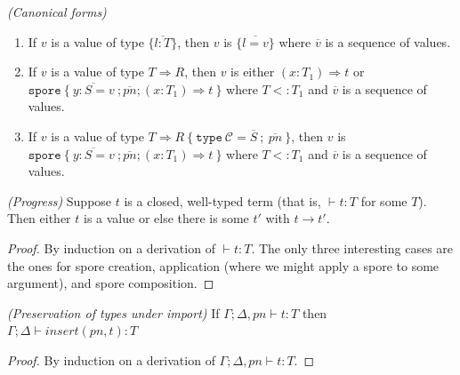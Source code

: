 \documentclass{llncs}
\newcommand{\seq}[1]{\overline{#1}}
\begin{document}
\begin{lemma}
\emph{(Canonical forms)}
\label{lem:canonical}
\begin{enumerate}

\item If $v$ is a value of type $\{ \seq{l : T} \}$, then $v$ is $\{ \seq{l = v} \}$ where $\seq{v}$ is a sequence of values.

\item If $v$ is a value of type $T \Rightarrow R$, then $v$ is either $(x: T_1) \Rightarrow t$ or \\ $\texttt{spore}~\{~\seq{y : S = v}~; \seq{pn} ; (x: T_1) \Rightarrow t~\}$ where $T <: T_1$ and $\seq{v}$ is a sequence of values.

\item If $v$ is a value of type $T \Rightarrow R~\{~\texttt{type}~\mathcal{C} = \seq{S}~;~\seq{pn}~\}$, then $v$ is \\ $\texttt{spore}~\{~\seq{y : S = v}~; \seq{pn} ; (x: T_1) \Rightarrow t~\}$ where $T <: T_1$ and $\seq{v}$ is a sequence of values.


\end{enumerate}
\end{lemma}


\begin{theorem}
\emph{(Progress)}
\label{th:progress}
Suppose $t$ is a closed, well-typed term (that is, $\vdash t : T$ for some $T$). Then either $t$ is a value or else there is some $t'$ with $t \rightarrow t'$.
\end{theorem}
\begin{proof}
By induction on a derivation of $\vdash t : T$. The only three interesting cases are the ones for spore creation, application (where we might apply a spore to some argument), and spore composition.
\end{proof}


\begin{lemma}
\emph{(Preservation of types under import)}
\label{lem:pres-import}
If $\Gamma ; \Delta, pn \vdash t : T$ then $\Gamma ; \Delta \vdash insert(pn, t) : T$
\end{lemma}
\begin{proof}
By induction on a derivation of $\Gamma ; \Delta, pn \vdash t : T$.
\end{proof}
\end{document}
